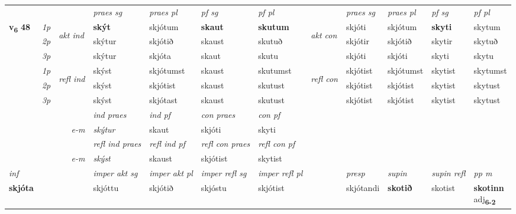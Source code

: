 \begin{longtable}[l]{X>{\footnotesize\itshape}llXXXXlXXXX}
\midrule

 & &   & \textit{praes sg}  & \textit{praes pl}    & \textit{ pf sg} & \textit{pf pl} & & \textit{praes sg}  & \textit{praes pl}    & \textit{pf sg} & \textit{pf pl }  \\ \cmidrule{4-7} \cmidrule{9-12}
 \multirow{2}{*}{{{\textbf{v{\textsubscript{6}}} \Large{\textbf{48}}}}}  & 1p & \multirow{3}{*}{\begin{turn}{90}\textit{akt ind}\end{turn}} & \textbf{skýt} & skjótum & \textbf{skaut} & \textbf{skutum} & \multirow{3}{*}{\begin{turn}{90}\textit{akt con}\end{turn}} &skjóti & skjótum & \textbf{skyti} & skytum\\*
 & 2p &  &  skýtur  & skjótið & skaust & skutuð & & skjótir & skjótið & skytir & skytuð \\*
 & 3p &  & skýtur & skjóta & skaut & skutu & & skjóti & skjóti& skyti & skytu \\*
\cmidrule{4-7} \cmidrule{9-12}
 & 1p & \multirow{3}{*}{\begin{turn}{90}\textit{refl ind}\end{turn}}  & skýst & skjótumst & skaust & skutumst & \multirow{3}{*}{\begin{turn}{90}\textit{refl con}\end{turn}}  &skjótist & skjótumst & skytist & skytumst \\*
 & 2p &  & skýst & skjótist & skaust & skutust & &skjótist & skjótist & skytist & skytust \\*
 & 3p  & & skýst & skjótast & skaust & skutust & & skjótist & skjótist& skytist & skytust \\*
\cmidrule{4-7} \cmidrule{9-12}

   && &  \textit{ind praes} & \textit{ind pf} & \textit{con praes} & \textit{con pf} \\*
\multicolumn{3}{r}{\textit{e-m}} & skýtur & skaut & skjóti & skyti \\*

\cmidrule{4-7}
 & && \textit{refl ind praes} & \textit{refl ind pf} & \textit{refl con praes} & \textit{refl con pf} \\*
\multicolumn{3}{r}{\textit{e-m}}& skýst & skaust & skjótist & skytist \\*

\cmidrule{4-7}
   {\textit{inf}} & &  & \textit{imper akt sg} & \textit{imper akt pl} & \textit{imper refl sg} & \textit{imper refl pl} && \textit{presp} & \textit{supin} & \textit{supin refl} & \textit{pp m} \\*
  {\textbf{skjóta}} & && skjóttu  & skjótið & skjóstu & skjótist && skjótandi &  \textbf{skotið} & skotist & \specialcell{\textbf{skotinn} \\ adj\textbf{\textsubscript{6-2}}} \\*


\end{longtable}
